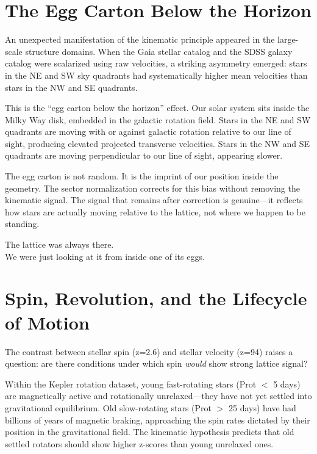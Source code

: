 \documentclass[11pt, letterpaper, openany]{book}
\begin{document}
\section*{The Egg Carton Below the Horizon}

An unexpected manifestation of the kinematic principle appeared in the large-scale structure
domains. When the Gaia stellar catalog and the SDSS galaxy catalog were scalarized using raw
velocities, a striking asymmetry emerged: stars in the NE and SW sky quadrants had
systematically higher mean velocities than stars in the NW and SE quadrants.

This is the ``egg carton below the horizon'' effect. Our solar system sits inside the Milky Way
disk, embedded in the galactic rotation field. Stars in the NE and SW quadrants are moving
with or against galactic rotation relative to our line of sight, producing elevated projected
transverse velocities. Stars in the NW and SE quadrants are moving perpendicular to our line
of sight, appearing slower.

The egg carton is not random. It is the imprint of our position inside the geometry. The
sector normalization corrects for this bias without removing the kinematic signal. The signal
that remains after correction is genuine---it reflects how stars are actually moving relative to
the lattice, not where we happen to be standing.

The lattice was always there.\\
We were just looking at it from inside one of its eggs.

\section*{Spin, Revolution, and the Lifecycle of Motion}

The contrast between stellar spin (z=2.6) and stellar velocity (z=94) raises a question:
are there conditions under which spin \emph{would} show strong lattice signal?

Within the Kepler rotation dataset, young fast-rotating stars (Prot $<$ 5 days) are
magnetically active and rotationally unrelaxed---they have not yet settled into gravitational
equilibrium. Old slow-rotating stars (Prot $>$ 25 days) have had billions of years of magnetic
braking, approaching the spin rates dictated by their position in the gravitational field.
The kinematic hypothesis predicts that old settled rotators should show higher z-scores than
young unrelaxed ones.
\end{document}
